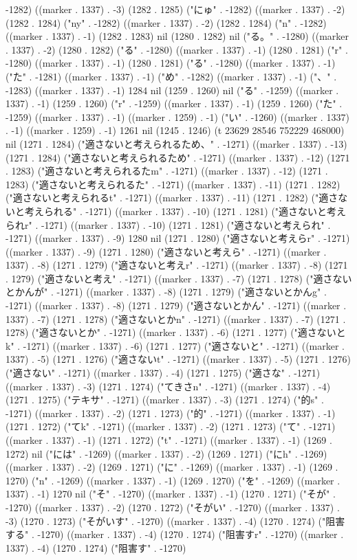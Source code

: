 -1282) ((marker . 1337) . -3) (1282 . 1285) ("にゅ" . -1282) ((marker . 1337) . -2) (1282 . 1284) ("ny" . -1282) ((marker . 1337) . -2) (1282 . 1284) ("n" . -1282) ((marker . 1337) . -1) (1282 . 1283) nil (1280 . 1282) nil ("る。" . -1280) ((marker . 1337) . -2) (1280 . 1282) ("る" . -1280) ((marker . 1337) . -1) (1280 . 1281) ("r" . -1280) ((marker . 1337) . -1) (1280 . 1281) ("る" . -1280) ((marker . 1337) . -1) ("た" . -1281) ((marker . 1337) . -1) ("め" . -1282) ((marker . 1337) . -1) ("、" . -1283) ((marker . 1337) . -1) 1284 nil (1259 . 1260) nil ("る" . -1259) ((marker . 1337) . -1) (1259 . 1260) ("r" . -1259) ((marker . 1337) . -1) (1259 . 1260) ("た" . -1259) ((marker . 1337) . -1) ((marker . 1259) . -1) ("い" . -1260) ((marker . 1337) . -1) ((marker . 1259) . -1) 1261 nil (1245 . 1246) (t 23629 28546 752229 468000) nil (1271 . 1284) ("適さないと考えられるため、" . -1271) ((marker . 1337) . -13) (1271 . 1284) ("適さないと考えられるため" . -1271) ((marker . 1337) . -12) (1271 . 1283) ("適さないと考えられるたm" . -1271) ((marker . 1337) . -12) (1271 . 1283) ("適さないと考えられるた" . -1271) ((marker . 1337) . -11) (1271 . 1282) ("適さないと考えられるt" . -1271) ((marker . 1337) . -11) (1271 . 1282) ("適さないと考えられる" . -1271) ((marker . 1337) . -10) (1271 . 1281) ("適さないと考えられr" . -1271) ((marker . 1337) . -10) (1271 . 1281) ("適さないと考えられ" . -1271) ((marker . 1337) . -9) 1280 nil (1271 . 1280) ("適さないと考えらr" . -1271) ((marker . 1337) . -9) (1271 . 1280) ("適さないと考えら" . -1271) ((marker . 1337) . -8) (1271 . 1279) ("適さないと考えr" . -1271) ((marker . 1337) . -8) (1271 . 1279) ("適さないと考え" . -1271) ((marker . 1337) . -7) (1271 . 1278) ("適さないとかんが" . -1271) ((marker . 1337) . -8) (1271 . 1279) ("適さないとかんg" . -1271) ((marker . 1337) . -8) (1271 . 1279) ("適さないとかん" . -1271) ((marker . 1337) . -7) (1271 . 1278) ("適さないとかn" . -1271) ((marker . 1337) . -7) (1271 . 1278) ("適さないとか" . -1271) ((marker . 1337) . -6) (1271 . 1277) ("適さないとk" . -1271) ((marker . 1337) . -6) (1271 . 1277) ("適さないと" . -1271) ((marker . 1337) . -5) (1271 . 1276) ("適さないt" . -1271) ((marker . 1337) . -5) (1271 . 1276) ("適さない" . -1271) ((marker . 1337) . -4) (1271 . 1275) ("適さな" . -1271) ((marker . 1337) . -3) (1271 . 1274) ("てきさn" . -1271) ((marker . 1337) . -4) (1271 . 1275) ("テキサ" . -1271) ((marker . 1337) . -3) (1271 . 1274) ("的s" . -1271) ((marker . 1337) . -2) (1271 . 1273) ("的" . -1271) ((marker . 1337) . -1) (1271 . 1272) ("てk" . -1271) ((marker . 1337) . -2) (1271 . 1273) ("て" . -1271) ((marker . 1337) . -1) (1271 . 1272) ("t" . -1271) ((marker . 1337) . -1) (1269 . 1272) nil ("には" . -1269) ((marker . 1337) . -2) (1269 . 1271) ("にh" . -1269) ((marker . 1337) . -2) (1269 . 1271) ("に" . -1269) ((marker . 1337) . -1) (1269 . 1270) ("n" . -1269) ((marker . 1337) . -1) (1269 . 1270) ("を" . -1269) ((marker . 1337) . -1) 1270 nil ("そ" . -1270) ((marker . 1337) . -1) (1270 . 1271) ("そが" . -1270) ((marker . 1337) . -2) (1270 . 1272) ("そがい" . -1270) ((marker . 1337) . -3) (1270 . 1273) ("そがいす" . -1270) ((marker . 1337) . -4) (1270 . 1274) ("阻害する" . -1270) ((marker . 1337) . -4) (1270 . 1274) ("阻害すr" . -1270) ((marker . 1337) . -4) (1270 . 1274) ("阻害す" . -1270) 